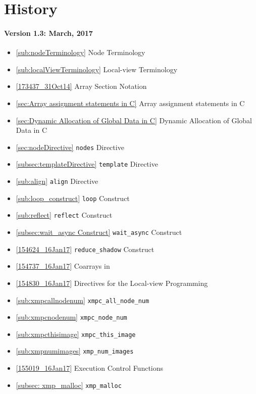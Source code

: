 \section*{History}

\paragraph*{Version 1.3: March, 2017}

\begin{itemize}
  \item \ref{sub:nodeTerminology}      Node Terminology
  \item \ref{sub:localViewTerminology} Local-view Terminology
  \item \ref{173437_31Oct14}           Array Section Notation
  \item \ref{sec:Array assignment statements in C} Array assignment
		statements in C
  \item \ref{sec:Dynamic Allocation of Global Data in C} Dynamic
		Allocation of Global Data in C
  \item \ref{sec:nodeDirective}        {\tt nodes} Directive
  \item \ref{subsec:templateDirective} {\tt template} Directive
  \item \ref{sub:align}                {\tt align} Directive
  \item \ref{sub:loop_construct}       {\tt loop} Construct
  \item \ref{sub:reflect}              {\tt reflect} Construct
  \item \ref{subsec:wait_async Construct} {\tt wait\_async} Construct
  \item \ref{154624_16Jan17}           {\tt reduce\_shadow} Construct
  \item \ref{154737_16Jan17}           Coarrays in {\XMPC}
  \item \ref{154830_16Jan17}           Directives for the Local-view
		Programming
  \item \ref{sub:xmpcallnodenum}       {\tt xmpc\_all\_node\_num}
  \item \ref{sub:xmpcnodenum}          {\tt xmpc\_node\_num}
  \item \ref{sub:xmpcthisimage}        {\tt xmpc\_this\_image}
  \item \ref{sub:xmpnumimages}         {\tt xmp\_num\_images}
  \item \ref{155019_16Jan17}           Execution Control Functions
  \item \ref{subsec: xmp_malloc}       {\tt xmp\_malloc}

\end{itemize}
